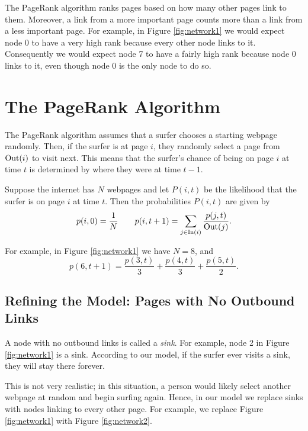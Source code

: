 The PageRank algorithm ranks pages based on how many other pages link to them.
Moreover, a link from a more important page counts more than a link from a less important page.
For example, in Figure \ref{fig:network1} we would expect node 0 to have a very high rank because every other node links to it. 
Consequently we would expect node 7 to have a fairly high rank because node 0 links to it, even though node 0 is the only node to do so.

\section*{The PageRank Algorithm}
The PageRank algorithm assumes that a surfer chooses a starting webpage randomly.
Then, if the surfer is at page $i$, they randomly select a page from $\operatorname{Out}(i)$ to visit next.
This means that the surfer's chance of being on page $i$ at time $t$ is determined by where they were at time $t-1$.

Suppose the internet has $N$ webpages and let $P(i,t)$ be the likelihood that the surfer is on page $i$ at time $t$.
Then the probabilities $P(i,t)$ are given by
\begin{equation}\label{equ:pr1}
p(i,0)=\frac{1}{N} \qquad p(i,t+1) = \sum_{j \in \operatorname{In}(i)} \frac{p(j,t)}{\operatorname{Out}(j)}.
\end{equation}

For example, in Figure \ref{fig:network1} we have $N=8$, and 
\[
p(6, t+1)=\frac{p(3,t)}{3}+\frac{p(4,t)}{3} + \frac{p(5,t)}{2}.
\]

\subsection*{Refining the Model: Pages with No Outbound Links}
A node with no outbound links is called a \emph{sink}. 
For example, node 2 in Figure \ref{fig:network1} is a sink.
According to our model, if the surfer ever visits a sink, they will stay there forever.

This is not very realistic; in this situation, a person would likely select another webpage at random and begin surfing again.
Hence, in our model we replace sinks with nodes linking to every other page. 
For example, we replace Figure \ref{fig:network1} with Figure \ref{fig:network2}.

